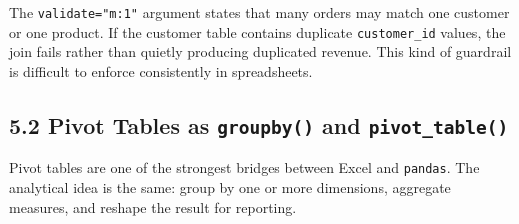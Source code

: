\documentclass[
  12pt,
]{article}
\begin{document}
The \texttt{validate="m:1"} argument states that many orders may match
one customer or one product. If the customer table contains duplicate
\texttt{customer\_id} values, the join fails rather than quietly
producing duplicated revenue. This kind of guardrail is difficult to
enforce consistently in spreadsheets.

\subsection{\texorpdfstring{5.2 Pivot Tables as \texttt{groupby()} and
\texttt{pivot\_table()}}{5.2 Pivot Tables as groupby() and pivot\_table()}}\label{pivot-tables-as-groupby-and-pivot_table}

Pivot tables are one of the strongest bridges between Excel and
\texttt{pandas}. The analytical idea is the same: group by one or more
dimensions, aggregate measures, and reshape the result for reporting.
\end{document}
